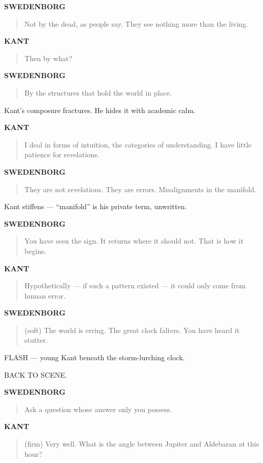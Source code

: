 \documentclass[12pt]{article}
\newcommand{\Character}[1]{\vspace{0.8em}\textbf{#1}\vspace{0.4em}}
\newenvironment{Dialogue}{\begin{quote}\begin{RaggedRight}}{\end{RaggedRight}\end{quote}}
\newcommand{\Action}[1]{\vspace{0.4em}#1\vspace{0.4em}}
\begin{document}
\Character{SWEDENBORG}
\begin{Dialogue}
Not by the dead, as people say.  
They see nothing more than the living.
\end{Dialogue}

\Character{KANT}
\begin{Dialogue}
Then by what?
\end{Dialogue}

\Character{SWEDENBORG}
\begin{Dialogue}
By the structures that hold the world in place.
\end{Dialogue}

\Action{Kant’s composure fractures.  
He hides it with academic calm.}

\Character{KANT}
\begin{Dialogue}
I deal in forms of intuition, the categories of understanding.  
I have little patience for revelations.
\end{Dialogue}

\Character{SWEDENBORG}
\begin{Dialogue}
They are not revelations.  
They are errors.  
Misalignments in the manifold.
\end{Dialogue}

\Action{Kant stiffens — “manifold” is his private term, unwritten.}

\Character{SWEDENBORG}
\begin{Dialogue}
You have seen the sign.  
It returns where it should not.  
That is how it begins.
\end{Dialogue}

\Character{KANT}
\begin{Dialogue}
Hypothetically — if such a pattern existed —  
it could only come from human error.
\end{Dialogue}

\Character{SWEDENBORG}
\begin{Dialogue}
(soft)  
The world is erring.  
The great clock falters.  
You have heard it stutter.
\end{Dialogue}

\Action{FLASH — young Kant beneath the storm-lurching clock.}

\Action{BACK TO SCENE.}

\Character{SWEDENBORG}
\begin{Dialogue}
Ask a question whose answer only you possess.
\end{Dialogue}

\Character{KANT}
\begin{Dialogue}
(firm)  
Very well.  
What is the angle between Jupiter and Aldebaran at this hour?
\end{Dialogue}
\end{document}
